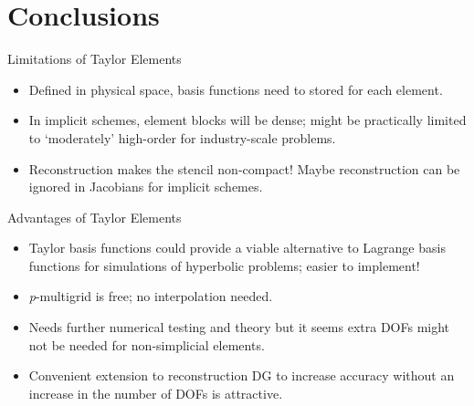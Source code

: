 \documentclass[11pt]{beamer}
\begin{document}
\section{Conclusions}
\begin{frame}{Limitations of Taylor Elements}
\begin{itemize}
	\item Defined in physical space, basis functions need to stored for each element.
	\item In implicit schemes, element blocks will be dense; might be practically limited to `moderately' high-order for industry-scale problems.
	\item Reconstruction makes the stencil non-compact! Maybe reconstruction can be ignored in Jacobians for implicit schemes.
\end{itemize}
\end{frame}
\begin{frame}{Advantages of Taylor Elements}
\begin{itemize}
\item Taylor basis functions could provide a viable alternative to Lagrange basis functions for simulations of hyperbolic problems; easier to implement!
\item \emph{p}-multigrid is free; no interpolation needed.
\item Needs further numerical testing and theory but it seems extra DOFs might not be needed for non-simplicial elements.
\item Convenient extension to reconstruction DG to increase accuracy without an increase in the number of DOFs is attractive.
\end{itemize}
\end{frame}


\end{document}
